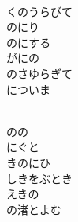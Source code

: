 \documentclass[10pt,b5j]{tarticle} %
\begin{document}
\begin{enumerate}
\begin{minipage}[c]{\blocksize}
    \end{minipage}
    \begin{minipage}[c]{\blocksize}
        
        \vspace{\linespace}
        \item~\\
        くのうらびて\\
        のにり\\
        のにする\\
        がにの\\
        のさゆらぎて\\
        についま
        
    \end{minipage}
    \begin{minipage}[c]{\blocksize}
        
        \vspace{\linespace}
        \item~\\
        のの\\
        にぐと\\
        きのにひ\\
        しきをぶとき\\
        えきの\\
        の渚とよむ
    
    \end{minipage}
\end{enumerate} %
\end{document}

